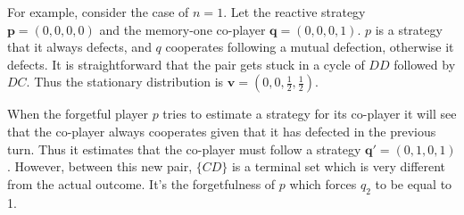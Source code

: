 \documentclass{article}
\theoremstyle{definition}
\begin{document}
For example, consider the case of \(n=1\). Let the reactive strategy
\(\mathbf{p} = (0, 0, 0, 0)\) and the memory-one co-player \(\mathbf{q} = (0, 0,
0, 1)\). \(p\) is a strategy that it always defects, and \(q\) cooperates
following a mutual defection, otherwise it defects. It is straightforward that
the pair gets stuck in a cycle of \(DD\) followed by \(DC\). Thus the stationary
distribution is \(\mathbf{v} = (0, 0, \frac{1}{2}, \frac{1}{2})\).

When the forgetful player \(p\) tries to estimate a strategy for its co-player
it will see that the co-player always cooperates given that it has defected in
the previous turn. Thus it estimates that the co-player must follow a strategy
\(\mathbf{q'} = (0, 1, 0, 1)\). However, between this new pair, \(\{CD\}\) is a
terminal set which is very different from the actual outcome. It's the
forgetfulness of \(p\) which forces \(q_2\) to be equal to 1.


\end{document}
